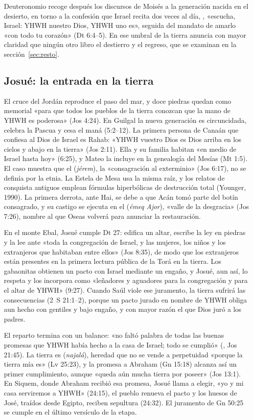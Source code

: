 Deuteronomio recoge después los discursos de Moisés a la generación nacida en el desierto, en torno a la confesión que Israel recita dos veces al día, , «escucha, Israel: YHWH nuestro Dios, YHWH uno es», seguida del mandato de amarlo «con todo tu corazón» (Dt 6:4–5). En ese umbral de la tierra anuncia con mayor claridad que ningún otro libro el destierro y el regreso, que se examinan en la sección~\ref{sec:resto}.

\subsection{Josué: la entrada en la tierra}
El cruce del Jordán reproduce el paso del mar, y doce piedras quedan como memorial «para que todos los pueblos de la tierra conozcan que la mano de YHWH es poderosa» (Jos 4:24). En Guilgal la nueva generación es circuncidada, celebra la Pascua y cesa el maná (5:2–12). La primera persona de Canaán que confiesa al Dios de Israel es Rahab: «YHWH vuestro Dios es Dios arriba en los cielos y abajo en la tierra» (Jos 2:11). Ella y su familia habitan «en medio de Israel hasta hoy» (6:25), y Mateo la incluye en la genealogía del Mesías (Mt 1:5). El caso muestra que el  (\emph{jérem}), la «consagración al exterminio» (Jos 6:17), no se definía por la etnia. La Estela de Mesa usa la misma raíz, y los relatos de conquista antiguos emplean fórmulas hiperbólicas de destrucción total (Younger, 1990). La primera derrota, ante Hai, se debe a que Acán tomó parte del botín consagrado, y su castigo se ejecuta en el  (\emph{émeq Ajor}), «valle de la desgracia» (Jos 7:26), nombre al que Oseas volverá para anunciar la restauración.

En el monte Ebal, Josué cumple Dt 27: edifica un altar, escribe la ley en piedras y la lee ante «toda la congregación de Israel, y las mujeres, los niños y los extranjeros que habitaban entre ellos» (Jos 8:35), de modo que los extranjeros están presentes en la primera lectura pública de la Torá en la tierra. Los gabaonitas obtienen un pacto con Israel mediante un engaño, y Josué, aun así, lo respeta y los incorpora como «leñadores y aguadores para la congregación y para el altar de YHWH» (9:27). Cuando Saúl viole ese juramento, la tierra sufrirá las consecuencias (2~S 21:1–2), porque un pacto jurado en nombre de YHWH obliga aun hecho con gentiles y bajo engaño, y con mayor razón el que Dios juró a los padres.

El reparto termina con un balance: «no faltó palabra de todas las buenas promesas que YHWH había hecho a la casa de Israel; todo se cumplió» (, Jos 21:45). La tierra es  (\emph{najalá}), heredad que no se vende a perpetuidad «porque la tierra mía es» (Lv 25:23), y la promesa a Abraham (Gn 15:18) alcanza así un primer cumplimiento, aunque «queda aún mucha tierra por poseer» (Jos 13:1). En Siquem, donde Abraham recibió esa promesa, Josué llama a elegir, «yo y mi casa serviremos a YHWH» (24:15), el pueblo renueva el pacto y los huesos de José, traídos desde Egipto, reciben sepultura (24:32). El juramento de Gn 50:25 se cumple en el último versículo de la etapa.

